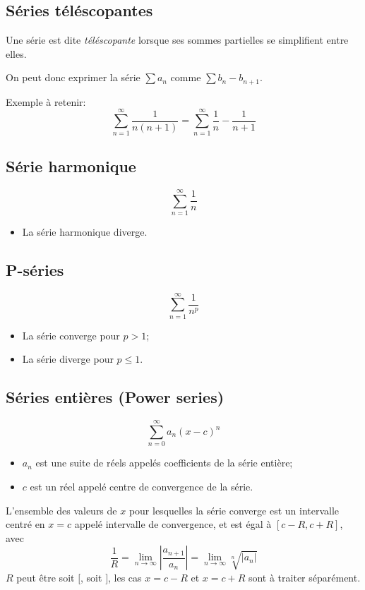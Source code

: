 \subsection{Séries téléscopantes}
Une série est dite \emph{téléscopante} lorsque
ses sommes partielles se simplifient entre elles.

On peut donc exprimer la série $\sum a_n$ comme $\sum b_n - b_{n+1}$.

Exemple à retenir:
\[ \sum_{n = 1}^{\infty} \frac{1}{n(n + 1)} = \sum_{n =1}^{\infty} \frac{1}{n} - \frac{1}{n + 1} \]

\subsection{Série harmonique}
\[ \sum_{n = 1}^{\infty} \frac{1}{n} \]
\begin{itemize}
  \item La série harmonique diverge.
\end{itemize}

\subsection{P-séries}
\[ \sum_{n = 1}^{\infty} \frac{1}{n^p} \]
\begin{itemize}
  \item La série converge pour $p > 1$;
  \item La série diverge pour $p \leq 1$.
\end{itemize}

\subsection{Séries entières (Power series)}
\[ \sum_{n =0}^{\infty}  a_n(x - c)^n \]
\begin{itemize}
  \item $a_n$ est une suite de réels appelés coefficients de la série entière;
  \item $c$ est un réel appelé centre de convergence de la série.
\end{itemize}

L'ensemble des valeurs de $x$ pour lesquelles la série converge est
un intervalle centré en $x = c$ appelé intervalle de convergence,
 et est égal à $[c - R, c + R]$, avec
\[ \frac{1}{R} = \lim_{n \to \infty} \left| \frac{a_{n + 1}}{a_n} \right|
  = \lim_{n \to \infty} \sqrt[n]{|a_n|} \]
$R$ peut être soit $[$, soit $]$,
les cas $x = c - R$ et $x = c + R$ sont à traiter séparément.

